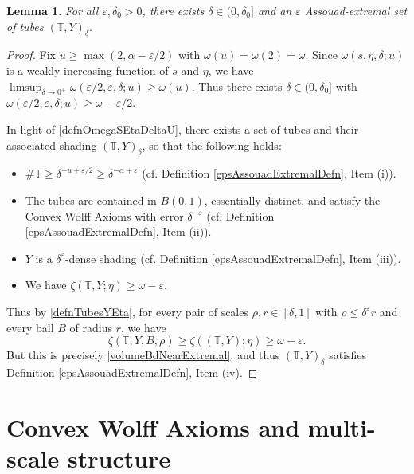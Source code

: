 \documentclass[letterpaper, reqno,11pt]{article}
\numberwithin{equation}{section}
\newcommand{\eps}{\varepsilon}
\newcommand{\tubes}{\mathbb{T}}
\numberwithin{thm}{section}
\newtheorem{lem}[thm]{Lemma}
\theoremstyle{remark}
\begin{document}
\begin{lem}\label{exitenceOfEpsExtremalKakeyaLem}
For all $\eps,\delta_0>0$, there exists $\delta\in(0,\delta_0]$ and an $\eps$ Assouad-extremal set of tubes $(\tubes,Y)_\delta.$
\end{lem}
\begin{proof}
Fix $u\geq \max(2, \alpha-\eps/2)$ with $\omega(u)=\omega(2)=\omega$. Since $\omega(s,\eta,\delta;u)$ is a weakly increasing function of $s$ and $\eta$, we have $\limsup_{\delta\to 0^+}\omega(\eps/2,\eps,\delta;u)\geq\omega(u)$. Thus there exists $\delta\in (0,\delta_0]$ with $\omega(\eps/2,\eps,\delta;u)\geq\omega-\eps/2$. 

In light of \eqref{defnOmegaSEtaDeltaU}, there exists a set of tubes and their associated shading $(\tubes,Y)_\delta$, so that the following holds:
\begin{itemize}
\item[(a)] $\#\tubes\geq\delta^{-u+\eps/2}\geq\delta^{-\alpha+\eps}$ (cf. Definition \ref{epsAssouadExtremalDefn}, Item (i)).
\item[(b)] The tubes are contained in $B(0,1)$, essentially distinct, and satisfy the Convex Wolff Axioms with error $\delta^{-\eps}$ (cf. Definition \ref{epsAssouadExtremalDefn}, Item (ii)).
\item[(c)] $Y$ is a $\delta^{\eps}$-dense shading (cf. Definition \ref{epsAssouadExtremalDefn}, Item (iii)).
\item[(d)] We have $\zeta( \tubes,Y; \eta)\geq \omega-\eps$. 
\end{itemize}
Thus by \eqref{defnTubesYEta}, for every pair of scales $\rho,r\in[\delta,1]$ with $\rho\leq\delta^{\eps}r$ and every ball $B$ of radius $r$, we have
\[
\zeta( \tubes,Y,B, \rho)\geq  \zeta( (\tubes,Y); \eta)\geq \omega-\eps.
\]
But this is precisely \eqref{volumeBdNearExtremal}, and thus $(\tubes,Y)_\delta$ satisfies Definition \ref{epsAssouadExtremalDefn}, Item (iv).
\end{proof}




\section{Convex Wolff Axioms and multi-scale structure}\label{selfSimSection}
\end{document}
